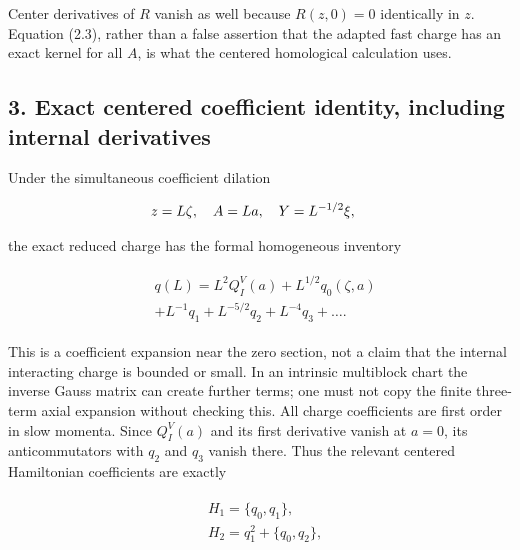 Center derivatives of \(R\) vanish as well because \(R(z,0)=0\)
identically in \(z\). Equation (2.3), rather than a false assertion that
the adapted fast charge has an exact kernel for all \(A\), is what the
centered homological calculation uses.

\subsection{3. Exact centered coefficient identity, including internal
derivatives}\label{c-exact-centered-coefficient-identity-including-internal-derivatives}

Under the simultaneous coefficient dilation

\begin{gather*}
\begin{aligned}
& z=L \zeta , \quad  A=L a, \quad  Y=L^{-1/2} \xi ,
\end{aligned}\notag
\end{gather*}

the exact reduced charge has the formal homogeneous inventory

\begin{gather*}
\begin{aligned}
& q(L) = L^{2} Q_{I}^{V}(a) + L^{1/2} q_{0}(\zeta ,a) \\
& + L^{-1} q_{1} + L^{-5/2} q_{2} + L^{-4} q_{3} + \ldots  .
\end{aligned}\tag{3.1}
\end{gather*}

This is a coefficient expansion near the zero section, not a claim that
the internal interacting charge is bounded or small. In an intrinsic
multiblock chart the inverse Gauss matrix can create further terms; one
must not copy the finite three-term axial expansion without checking
this. All charge coefficients are first order in slow momenta. Since
\(Q_{I}^{V}(a)\) and its first derivative vanish at \(a=0\), its
anticommutators with \(q_{2}\) and \(q_{3}\) vanish there. Thus the
relevant centered Hamiltonian coefficients are exactly

\begin{gather*}
\begin{aligned}
& H_{1} = \{q_{0},q_{1}\}, \\
& H_{2} = q_{1}^{2} + \{q_{0},q_{2}\},
\end{aligned}\tag{3.2}
\end{gather*}

